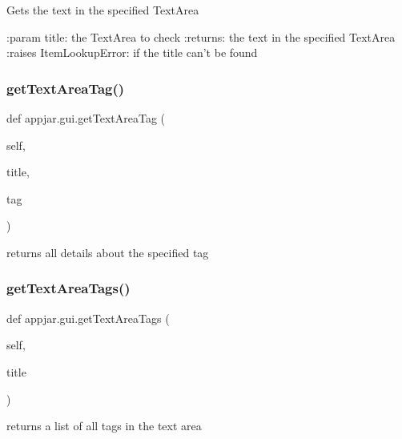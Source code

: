 \begin{DoxyVerb}Gets the text in the specified TextArea

:param title: the TextArea to check
:returns: the text in the specified TextArea
:raises ItemLookupError: if the title can't be found
\end{DoxyVerb}
 \mbox{\label{classappjar_1_1gui_a5a0ff51d6c6eb80d9117818b5d18c37d}} 
\subsubsection{\texorpdfstring{get\+Text\+Area\+Tag()}{getTextAreaTag()}}
{\footnotesize\ttfamily def appjar.\+gui.\+get\+Text\+Area\+Tag (\begin{DoxyParamCaption}\item[{}]{self,  }\item[{}]{title,  }\item[{}]{tag }\end{DoxyParamCaption})}

\begin{DoxyVerb}returns all details about the specified tag \end{DoxyVerb}
 \mbox{\label{classappjar_1_1gui_ab5562f151c9c5f03933d41e09f838507}} 
\subsubsection{\texorpdfstring{get\+Text\+Area\+Tags()}{getTextAreaTags()}}
{\footnotesize\ttfamily def appjar.\+gui.\+get\+Text\+Area\+Tags (\begin{DoxyParamCaption}\item[{}]{self,  }\item[{}]{title }\end{DoxyParamCaption})}

\begin{DoxyVerb}returns a list of all tags in the text area \end{DoxyVerb}
 \mbox{\label{classappjar_1_1gui_aaaa8a9d7f13977878bbabd556169c48a}} 
